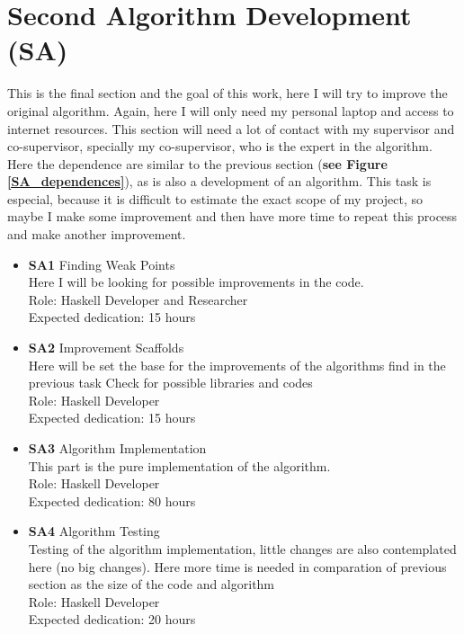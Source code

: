 \section{Second Algorithm Development \textbf{(SA)}}
This is the final section and the goal of this work, here I will try to improve the original algorithm.
Again, here I will only need my personal laptop and access to internet resources.
This section will need a lot of contact with my supervisor and co-supervisor, specially my co-supervisor, who is the expert in the algorithm.
Here the dependence are similar to the previous section (\textbf{see Figure \ref{SA_dependences}}), as is also a development of an algorithm.
This task is especial, because it is difficult to estimate the exact scope of my project, so maybe I make some improvement and then have more time to repeat this process and make another improvement.
\begin{itemize}
    \item \textbf{SA1} Finding Weak Points \\
        Here I will be looking for possible improvements in the code.\\
        Role: Haskell Developer and Researcher\\
        Expected dedication: 15 hours
        \item \textbf{SA2} Improvement Scaffolds \\
        Here will be set the base for the improvements of the algorithms find in the previous task
        Check for possible libraries and codes \\
        Role: Haskell Developer \\
        Expected dedication: 15 hours
    \item \textbf{SA3} Algorithm Implementation\\
        This part is the pure implementation of the algorithm. \\
        Role: Haskell Developer \\
        Expected dedication: 80 hours
    \item \textbf{SA4} Algorithm Testing \\
        Testing of the algorithm implementation, little changes are also contemplated here (no big changes).
        Here more time is needed in comparation of previous section as the size of the code and algorithm\\
        Role: Haskell Developer \\
        Expected dedication: 20 hours
\end{itemize}
